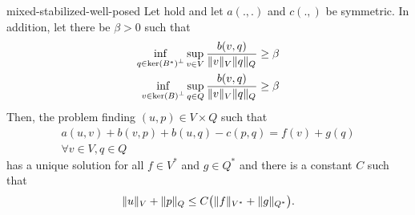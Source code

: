 \begin{Theorem}{mixed-stabilized-well-posed}
  Let  hold and
  let $a(.,.)$ and $c(.,)$ be symmetric. In addition, let there be
  $\beta>0$ such that
  \begin{gather}
    \begin{split}
      \inf_{q\in \operatorname{ker}\left(B^*\right)^\perp}  \sup_{v\in V}
      \frac{b(v,q)}{\lVert v\rVert_V\lVert q\rVert_Q} &\ge \beta\\
      \inf_{v\in \operatorname{ker}\left(B\right)^\perp}  \sup_{q\in Q}
      \frac{b(v,q)}{\lVert v\rVert_V\lVert q\rVert_Q} &\ge \beta
    \end{split}
  \end{gather}
  Then, the problem finding $(u,p)\in V\times Q$ such that
  \begin{multline}
    a(u,v) + b(v,p) + b(u,q) - c(p,q) = f(v)+g(q)
    \\
    \forall v\in V, q\in Q
  \end{multline}
  has a unique solution for all $f\in V^*$ and $g\in Q^*$ and there is
  a constant $C$ such that
  \begin{gather}
    \lVert u\rVert_V+\lVert p\rVert_Q
    \le C \bigl(\lVert f\rVert_{V^*} + \lVert g\rVert_{Q^*}\bigr).
  \end{gather}
\end{Theorem}

